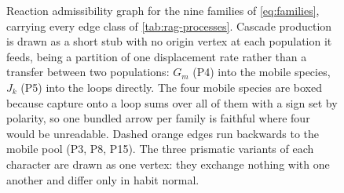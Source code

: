\begin{figure}[htbp]
\caption{Reaction admissibility graph for the nine families of
\cref{eq:families}, carrying every edge class of \cref{tab:rag-processes}.
Cascade production is drawn as a short stub with no origin vertex at each
population it feeds, being a partition of one displacement rate rather than a
transfer between two populations: $G_m$ (P4) into the mobile species, $J_k$
(P5) into the loops directly. The four mobile species are boxed because capture
onto a loop sums over all of them with a sign set by polarity, so one bundled
arrow per family is faithful where four would be unreadable. Dashed orange
edges run backwards to the mobile pool (P3, P8, P15). The three prismatic
variants of each character are drawn as one vertex: they exchange nothing with
one another and differ only in habit normal.}
\label{fig:rag}
\end{figure}
